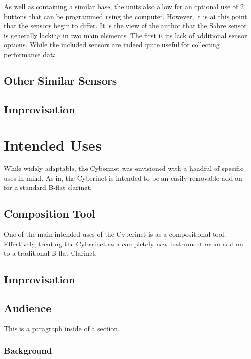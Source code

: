 As well as containing a similar base, the units also allow for an optional use of 2 buttons that can be programmed using the computer. However, it is at this point that the sensors begin to differ. It is the view of the author that the Sabre sensor is generally lacking in two main elements. The first is its lack of additional sensor options. While the included sensors are indeed quite useful for collecting performance data.

\section{Other Similar Sensors}


\section{Improvisation}




\chapter{Intended Uses}

While widely adaptable, the Cyberinet was envisioned with a handful of specific uses in mind. As in, the Cyberinet is intended to be an easily-removable add-on for a standard B-flat clarinet.

\section{Composition Tool}
One of the main intended uses of the Cyberinet is as a compositional tool. Effectively, treating the Cyberinet as a completely new instrument or an add-on to a traditional B-flat Clarinet.

\section{Improvisation}



\section{Audience}

This is a paragraph inside of a section.

\subsection{Background}
\label{sec:background}

